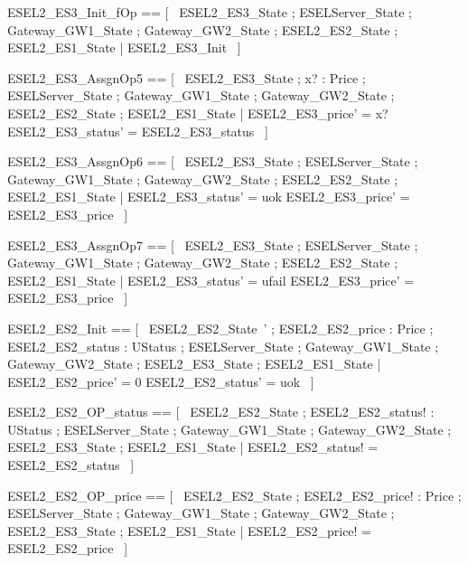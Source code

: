 \documentclass{article}
\begin{document}
\begin{zed}
	ESEL2\_ES3\_Init\_fOp == [~  \Xi ESEL2\_ES3\_State ; \Xi ESELServer\_State ; \Xi Gateway\_GW1\_State ; \Xi Gateway\_GW2\_State ; \Xi ESEL2\_ES2\_State ; \Xi ESEL2\_ES1\_State | \lnot \pre ESEL2\_ES3\_Init  ~]
\end{zed}

\begin{zed}
	ESEL2\_ES3\_AssgnOp5 == [~  \Delta ESEL2\_ES3\_State ; x? : Price ; \Xi ESELServer\_State ; \Xi Gateway\_GW1\_State ; \Xi Gateway\_GW2\_State ; \Xi ESEL2\_ES2\_State ; \Xi ESEL2\_ES1\_State | ESEL2\_ES3\_price' = x? \land ESEL2\_ES3\_status' = ESEL2\_ES3\_status  ~]
\end{zed}

\begin{zed}
	ESEL2\_ES3\_AssgnOp6 == [~  \Delta ESEL2\_ES3\_State ; \Xi ESELServer\_State ; \Xi Gateway\_GW1\_State ; \Xi Gateway\_GW2\_State ; \Xi ESEL2\_ES2\_State ; \Xi ESEL2\_ES1\_State | ESEL2\_ES3\_status' = uok \land ESEL2\_ES3\_price' = ESEL2\_ES3\_price  ~]
\end{zed}

\begin{zed}
	ESEL2\_ES3\_AssgnOp7 == [~  \Delta ESEL2\_ES3\_State ; \Xi ESELServer\_State ; \Xi Gateway\_GW1\_State ; \Xi Gateway\_GW2\_State ; \Xi ESEL2\_ES2\_State ; \Xi ESEL2\_ES1\_State | ESEL2\_ES3\_status' = ufail \land ESEL2\_ES3\_price' = ESEL2\_ES3\_price  ~]
\end{zed}

\begin{zed}
	ESEL2\_ES2\_Init == [~  ESEL2\_ES2\_State~' ; ESEL2\_ES2\_price : Price ; ESEL2\_ES2\_status : UStatus ; \Xi ESELServer\_State ; \Xi Gateway\_GW1\_State ; \Xi Gateway\_GW2\_State ; \Xi ESEL2\_ES3\_State ; \Xi ESEL2\_ES1\_State | ESEL2\_ES2\_price' = 0 \land ESEL2\_ES2\_status' = uok  ~]
\end{zed}

\begin{zed}
	ESEL2\_ES2\_OP\_status == [~  \Xi ESEL2\_ES2\_State ; ESEL2\_ES2\_status! : UStatus ; \Xi ESELServer\_State ; \Xi Gateway\_GW1\_State ; \Xi Gateway\_GW2\_State ; \Xi ESEL2\_ES3\_State ; \Xi ESEL2\_ES1\_State | ESEL2\_ES2\_status! = ESEL2\_ES2\_status  ~]
\end{zed}

\begin{zed}
	ESEL2\_ES2\_OP\_price == [~  \Xi ESEL2\_ES2\_State ; ESEL2\_ES2\_price! : Price ; \Xi ESELServer\_State ; \Xi Gateway\_GW1\_State ; \Xi Gateway\_GW2\_State ; \Xi ESEL2\_ES3\_State ; \Xi ESEL2\_ES1\_State | ESEL2\_ES2\_price! = ESEL2\_ES2\_price  ~]
\end{zed}
\end{document}
